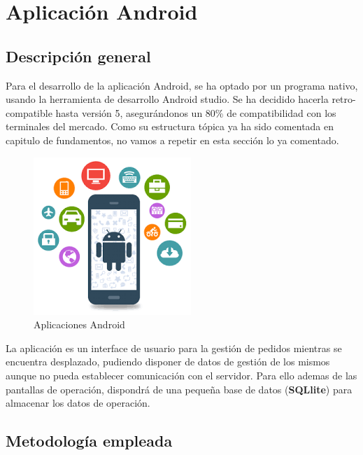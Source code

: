 \pagebreak

\section{Aplicación Android}

\subsection{Descripción general}

Para el desarrollo de la aplicación Android, se ha optado por un programa nativo, usando la herramienta de desarrollo Android studio. Se ha decidido hacerla retro-compatible hasta versión 5, asegurándonos un 80\% de compatibilidad con los terminales del mercado. Como su estructura tópica ya ha sido comentada en capitulo de fundamentos, no vamos a repetir en esta sección lo ya comentado.

\begin{figure}[H]
	\centering
	\includegraphics[width=0.7\linewidth]{figuras/app}
	\caption{Aplicaciones Android} 
	\label{fig:app}
\end{figure}

La aplicación es un interface de usuario para la gestión de pedidos mientras se encuentra desplazado, pudiendo disponer de datos de gestión de los mismos aunque no pueda establecer comunicación con el servidor. Para ello ademas de las pantallas de operación, dispondrá de una pequeña base de datos (\textbf{SQLlite}) para almacenar los datos de operación.

\subsection{Metodología empleada}

